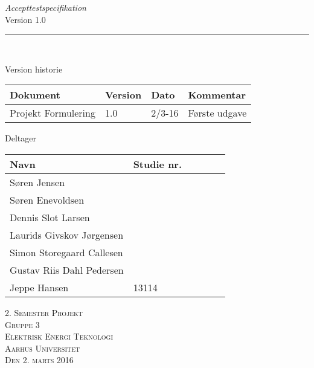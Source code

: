\thispagestyle{empty}
\begin{flushright}
\vspace{3cm}

\phantom{hul}

\phantom{hul}

\phantom{hul}

\textsl{\Huge Accepttestspecifikation} \\ %
Version 1.0

\rule{16cm}{3mm} \\ \vspace{1.5cm}
\vspace{1cm}


\begin{table}[H] 
\flushleft
Version historie \\
	\begin{tabular}{|l|l|l|l|} %
		
																			 \hline
		Dokument				& Version   & Dato   	& Kommentar 	 \\ \hline 	%
		Projekt Formulering 	& 1.0   	& 2/3-16 	& Første udgave	 \\ \hline 
		
	\end{tabular} 
\end{table}

\begin{table}[H] 
	\flushleft
\phantom{hul}

\phantom{hul}
	Deltager
	
	\begin{tabular}{|l|l|l|l|l|l|} %
		\hline 	%
		Navn						&Studie nr.		\\ \hline 	%
		Søren Jensen	 			& 		   		\\ \hline 
		Søren Enevoldsen 			&				\\ \hline
		Dennis Slot Larsen			&				\\ \hline
		Laurids Givskov Jørgensen	&				\\ \hline
		Simon Storegaard Callesen	&				\\ \hline
		Gustav Riis Dahl Pedersen	&				\\ \hline
		Jeppe Hansen				&13114			\\ \hline
		
	\end{tabular} 
\end{table}




\vspace{2cm} 
\textsc{\Large 2. Semester Projekt \\
Gruppe 3 \\
Elektrisk Energi Teknologi \\
Aarhus Universitet \\
Den 2. marts 2016 \\}
\end{flushright}